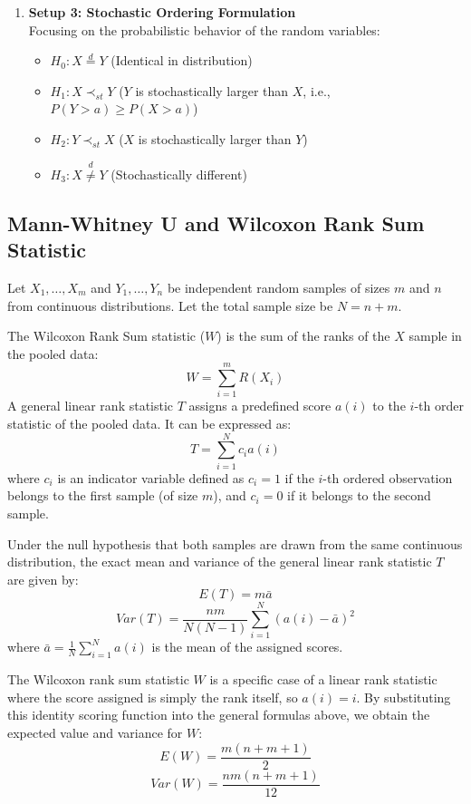 \documentclass[10pt]{article}
\begin{document}
\begin{enumerate}
\begin{enumerate}
    \item \textbf{Setup 3: Stochastic Ordering Formulation}\\
    Focusing on the probabilistic behavior of the random variables:
    \begin{itemize}
        \item $H_0: X \overset{d}{=} Y$ (Identical in distribution)
        \item $H_1: X \prec_{st} Y$ ($Y$ is stochastically larger than $X$, i.e., $P(Y > a) \geq P(X > a)$)
        \item $H_2: Y \prec_{st} X$ ($X$ is stochastically larger than $Y$)
        \item $H_3: X \overset{d}{\neq} Y$ (Stochastically different)
    \end{itemize}
\end{enumerate}
\end{enumerate}

\subsection{Mann-Whitney U and Wilcoxon Rank Sum Statistic}
Let $X_1, \dots, X_m$ and $Y_1, \dots, Y_n$ be independent random samples of sizes $m$ and $n$ from continuous distributions. Let the total sample size be $N = n + m$.

The Wilcoxon Rank Sum statistic ($W$) is the sum of the ranks of the $X$ sample in the pooled data:
$$W = \sum_{i=1}^m R(X_i)$$A general linear rank statistic $T$ assigns a predefined score $a(i)$ to the $i$-th order statistic of the pooled data. It can be expressed as:
$$T = \sum_{i=1}^N c_i a(i)$$
where $c_i$ is an indicator variable defined as $c_i = 1$ if the $i$-th ordered observation belongs to the first sample (of size $m$), and $c_i = 0$ if it belongs to the second sample.

Under the null hypothesis that both samples are drawn from the same continuous distribution, the exact mean and variance of the general linear rank statistic $T$ are given by:
$$E(T) = m\bar{a}$$
$$Var(T) = \frac{nm}{N(N-1)} \sum_{i=1}^N (a(i) - \bar{a})^2$$
where $\bar{a} = \frac{1}{N}\sum_{i=1}^N a(i)$ is the mean of the assigned scores.

The Wilcoxon rank sum statistic $W$ is a specific case of a linear rank statistic where the score assigned is simply the rank itself, so $a(i) = i$. By substituting this identity scoring function into the general formulas above, we obtain the expected value and variance for $W$:
$$E(W) = \frac{m(n+m+1)}{2}$$
$$Var(W) = \frac{nm(n+m+1)}{12}$$
\end{document}
